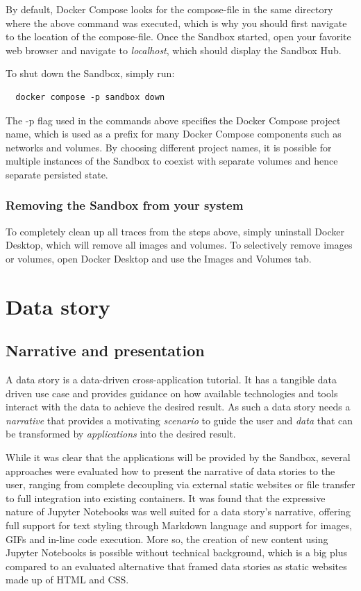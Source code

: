 \documentclass[11pt, a4paper, oneside, parskip=full-]{scrartcl}
\begin{document}
By default, Docker Compose looks for the compose-file in the same directory
where the above command was executed, which is why you should first navigate to
the location of the compose-file. Once the Sandbox started, open your favorite
web browser and navigate to \emph{localhost}, which should display the Sandbox
Hub.

To shut down the Sandbox, simply run:
\begin{lstlisting}
  docker compose -p sandbox down
\end{lstlisting}

The -p flag used in the commands above specifies the Docker Compose project
name, which is used as a prefix for many Docker Compose components such as
networks and volumes. By choosing different project names, it is possible for
multiple instances of the Sandbox to coexist with separate volumes and hence
separate persisted state.

\subsubsection*{Removing the Sandbox from your system}
To completely clean up all traces from the steps above, simply uninstall Docker
Desktop, which will remove all images and volumes. To selectively remove images
or volumes, open Docker Desktop and use the Images and Volumes tab.

\section{Data story}

\subsection{Narrative and presentation}
A data story is a data-driven cross-application tutorial. It has a tangible data
driven use case and provides guidance on how available technologies and tools
interact with the data to achieve the desired result. As such a data story needs
a \emph{narrative} that provides a motivating \emph{scenario} to guide the user
and \emph{data} that can be transformed by \emph{applications} into the desired
result.

While it was clear that the applications will be provided by the Sandbox,
several approaches were evaluated how to present the narrative of data stories
to the user, ranging from complete decoupling via external static websites or
file transfer to full integration into existing containers. It was found that
the expressive nature of Jupyter Notebooks was well suited for a data story's
narrative, offering full support for text styling through Markdown language and
support for images, GIFs and in-line code execution. More so, the creation of
new content using Jupyter Notebooks is possible without technical background,
which is a big plus compared to an evaluated alternative that framed data
stories as static websites made up of HTML and CSS.
\end{document}
